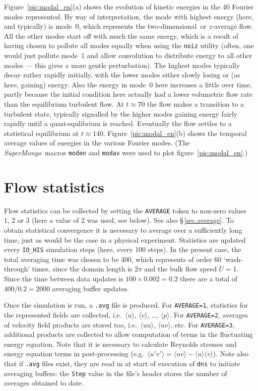 \documentclass[11pt,a4paper]{report}
\newcommand{\SM}{\emph{SuperMongo}}
\newcommand\twod{two-di\-men\-sion\-al}
\newcommand{\ie}{i.e.\ }
\newcommand{\eg}{e.g.\ }
\begin{document}
Figure~\ref{pic:modal_en}(a) shows the evolution of kinetic energies
in the 40 Fourier modes represented.  By way of interpretation, the
mode with highest energy (here, and typically) is mode~0, which
represents the \twod\ or $z$-average flow.  All the other modes start
off with much the same energy, which is a result of having chosen to
pollute all modes equally when using the \verb|noiz| utility (often,
one would just pollute mode~1 and allow convolution to distribute
energy to all other modes --- this gives a more gentle perturbation).
The highest modes typically decay rather rapidly initially, with the
lower modes either slowly losing or (as here, gaining) energy.  Also
the energy in mode~0 here increases a little over time, partly because
the initial condition here actually had a lower volumetric flow rate
than the equilibrium turbulent flow. At $t\approx70$ the flow makes a
transition to a turbulent state, typically signalled by the higher
modes gaining energy fairly rapidly until a quasi-equlibrium is
reached. Eventually the flow settles to a statistical equilibrium at
$t\approx140$.  Figure~\ref{pic:modal_en}(b) shows the temporal
average values of energies in the various Fourier modes.  (The
\SM\ macros \verb|moden| and \verb|modav| were used to
plot figure~\ref{pic:modal_en}.)

\section{Flow statistics}

Flow statistics can be collected by setting the \verb|AVERAGE| token
to non-zero values 1, 2 or 3 (here a value of 2 was used, see below).
See also \S\,\ref{sec.average}.  To obtain statistical convergence it
is necessary to average over a sufficiently long time, just as would
be the case in a physical experiment. Statistics are updated every
\verb|IO_HIS| simulation steps (here, every 100 steps).  In the
present case, the total averaging time was chosen to be 400, which
represents of order 60 `wash-through' times, since the domain length
is $2\pi$ and the bulk flow speed $U=1$.  Since the time between data
updates is $100\times0.002=0.2$ there are a total of $400/0.2=2000$
averaging buffer updates.

Once the simulation is run, a \texttt{.avg} file is produced. For
\verb|AVERAGE=1|, statistics for the represented fields are collected,
\ie $\langle u\rangle$, $\langle v\rangle$, \ldots, $\langle
p\rangle$.  For \verb|AVERAGE=2|, averages of velocity field products
are stored too, \ie $\langle uu\rangle$, $\langle uv\rangle$, etc.
For \verb|AVERAGE=3|, additional products are collected to allow
computation of terms in the fluctuating energy equation.  Note that it
is necessary to calculate Reynolds stresses and energy equation terms
in post-processing (\eg $\langle u'v'\rangle = \langle
uv\rangle-\langle u\rangle\langle v\rangle$).  Note also that if
\verb|.avg| files exist, they are read in at start of execution of
\verb|dns| to initiate averaging buffers: the \verb|Step| value in the
file's header stores the number of averages obtained to date.
\end{document}
